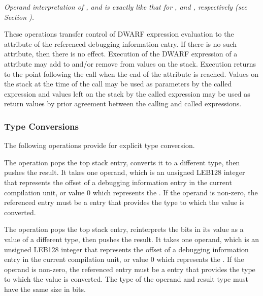 \begin{enumerate}[1. ]
\textit{Operand interpretation of
\DWOPcalltwo, \DWOPcallfour{} and \DWOPcallref{} is exactly like
that for \DWFORMreftwo, \DWFORMreffour{} and \DWFORMrefaddr,
respectively  
(see Section  ).}

These operations transfer control of DWARF expression evaluation to 
the 
\DWATlocation{}
attribute of the referenced debugging information entry. If
there is no such attribute, then there is no effect. Execution
of the DWARF expression of 
a 
\DWATlocation{} attribute may add
to and/or remove from values on the stack. Execution returns
to the point following the call when the end of the attribute
is reached. Values on the stack at the time of the call may be
used as parameters by the called expression and values left on
the stack by the called expression may be used as return values
by prior agreement between the calling and called expressions.
\end{enumerate}

\subsubsection{Type Conversions}
\label{chap:typeconversions}
The following operations provide for explicit type conversion.

\begin{enumerate}[1. ]
\itembfnl{\DWOPconvertTARG}
The \DWOPconvertNAME{} operation pops the top stack entry, converts it to a
different type, then pushes the result. It takes one operand, which is an
unsigned LEB128 integer that represents the offset of a debugging
information entry in the current compilation unit, or value 0 which
represents the \generictype. If the operand is non-zero, the
referenced entry must be a \DWTAGbasetype{} entry that provides the type
to which the value is converted.

\itembfnl{\DWOPreinterpretTARG}
The \DWOPreinterpretNAME{} operation pops the top stack entry, reinterprets
the bits in its value as a value of a different type, then pushes the
result. It takes one operand, which is an unsigned LEB128 integer that
represents the offset of a debugging information entry in the current
compilation unit, or value 0 which represents the \generictype.
If the operand is non-zero, the referenced entry must be a
\DWTAGbasetype{} entry that provides the type to which the value is converted.
The type of the operand and result type must have the same size in bits.

\end{enumerate}

